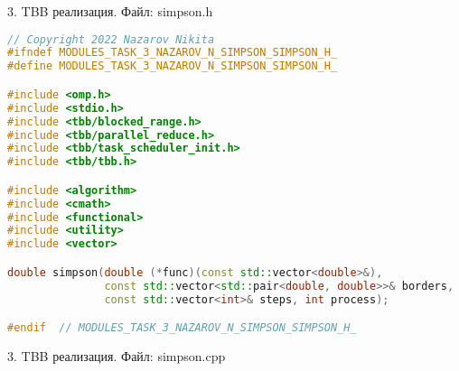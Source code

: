 \documentclass{report}
\begin{document}
\par 3. TBB реализация. Файл: simpson.h

\begin{lstlisting}[language=C++]
// Copyright 2022 Nazarov Nikita
#ifndef MODULES_TASK_3_NAZAROV_N_SIMPSON_SIMPSON_H_
#define MODULES_TASK_3_NAZAROV_N_SIMPSON_SIMPSON_H_

#include <omp.h>
#include <stdio.h>
#include <tbb/blocked_range.h>
#include <tbb/parallel_reduce.h>
#include <tbb/task_scheduler_init.h>
#include <tbb/tbb.h>

#include <algorithm>
#include <cmath>
#include <functional>
#include <utility>
#include <vector>

double simpson(double (*func)(const std::vector<double>&),
               const std::vector<std::pair<double, double>>& borders,
               const std::vector<int>& steps, int process);

#endif  // MODULES_TASK_3_NAZAROV_N_SIMPSON_SIMPSON_H_
\end{lstlisting}

\par 3. TBB реализация. Файл: simpson.cpp
\end{document}
